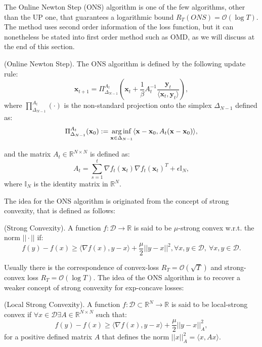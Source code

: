 The Online Newton Step (ONS) \cite{hazan2007logarithmic} algorithm is one of the few algorithms, other than the UP one, that guarantees a logarithmic bound $R_T(ONS)=\mathcal O(\log T)$. The method uses second order information of the loss function, but it can nonetheless be stated into first order method such as OMD, as we will discuss at the end of this section.

\begin{definition}(Online Newton Step).
The ONS algorithm is defined by the following update rule:
\begin{equation}\label{eq:update_ONS}
\mathbf x_{t+1}=\Pi^{A_t}_{\Delta_{N-1}}\left(\mathbf x_t+\frac{1}{\beta}A_t^{-1}\frac{\mathbf y_t}{\langle\mathbf x_t,\mathbf y_t\rangle}\right),
\end{equation}
where $\prod^{A_t}_{\Delta_{N-1}}(\cdot)$ is the non-standard projection onto the simplex $\Delta_{N-1}$ defined as:
\begin{equation}\label{eq:non_standard_proj}
\Pi^{A_t}_{\Delta_{N-1}}(\mathbf x_0):=\operatorname*{arg\,inf}\limits_{\mathbf x\in\Delta_{N-1}}\langle\mathbf x-\mathbf x_0,A_t(\mathbf x-\mathbf x_0)\rangle,
\end{equation}

and the matrix $A_t\in\mathbb R^{N\times N}$ is defined as:
\begin{equation}\label{eq:matrix_ONS}
A_t=\sum\limits_{s=1}^t \nabla f_t(\mathbf x_t)\nabla f_t(\mathbf x_t)^T+\epsilon\mathbb I_N,
\end{equation}
where $\mathbb I_N$ is the identity matrix in $\mathbb R^N$.
\end{definition}

The idea for the ONS algorithm is originated from the concept of strong convexity, that is defined as follows:

\begin{definition}(Strong Convexity).\label{def:strong_cnvx}
A function $f:\mathcal D\to\mathbb R$ is said to be $\mu$-strong convex w.r.t. the norm $||\cdot||$ if: 
$$f(y)-f(x)\ge\langle\nabla f(x),y-x\rangle+\frac{\mu}{2}||y-x||^2,\forall x,y\in\mathcal D,\ \forall x,y\in\mathcal D.$$
\end{definition}

Usually there is the correspondence of convex-loss $R_T=\mathcal O(\sqrt T)$ and strong-convex loss $R_T=\mathcal O(\log T)$. The idea of the ONS algorithm is to recover a weaker concept of strong convexity for exp-concave losses:

\begin{definition}(Local Strong Convexity).\label{def:weak_strong_cnvx}
A function $f:\mathcal D\subset \mathbb R^N\to\mathbb R$ is said to be local-strong convex if $\forall x\in\mathcal D\exists A\in\mathbb R^{N\times N}$ such that: 
$$f(y)-f(x)\ge\langle\nabla f(x),y-x\rangle+\frac{\mu}{2}||y-x||_{A}^2,$$
for a positive defined matrix $A$ that defines the norm $||x||^2_{A}=\langle x, Ax\rangle$.
\end{definition}

